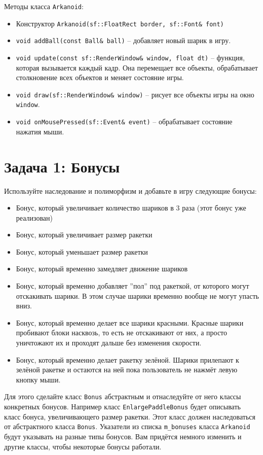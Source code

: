 \documentclass{article}
\begin{document}
Методы класса \texttt{Arkanoid}:
\begin{itemize}
\item Конструктор \texttt{Arkanoid(sf::FloatRect border, sf::Font\& font)}
\item \texttt{void addBall(const Ball\& ball)} -- добавляет новый шарик в игру.
\item \texttt{void update(const sf::RenderWindow\& window, float dt)} -- функция, которая вызывается каждый кадр. Она перемещает все объекты, обрабатывает столкновение всех объектов и меняет состояние игры.
\item \texttt{void draw(sf::RenderWindow\& window)} -- рисует все объекты игры на окно \texttt{window}.
\item \texttt{void onMousePressed(sf::Event\& event)} -- обрабатывает состояние нажатия мыши.
\end{itemize}


\newpage

\section*{Задача 1: Бонусы}
Используйте наследование и полиморфизм и добавьте в игру следующие бонусы:
\begin{itemize}
\item Бонус, который увеличивает количество шариков в 3 раза (этот бонус уже реализован)
\item Бонус, который увеличивает размер ракетки
\item Бонус, который уменьшает размер ракетки
\item Бонус, который временно замедляет движение шариков
\item Бонус, который временно добавляет ''пол'' под ракеткой, от которого могут отскакивать шарики. В этом случае шарики временно вообще не могут упасть вниз.
\item Бонус, который временно делает все шарики красными. Красные шарики пробивают блоки насквозь, то есть не отскакивают от них, а просто уничтожают их и проходят дальше без изменения скорости.
\item Бонус, который временно делает ракетку зелёной. Шарики прилепают к зелёной ракетке и остаются на ней пока пользователь не нажмёт левую кнопку мыши. 
\end{itemize}

Для этого сделайте класс \texttt{Bonus} абстрактным и отнаследуйте от него классы конкретных бонусов. Например класс \texttt{EnlargePaddleBonus} будет описывать класс бонуса, увеличивающего размер ракетки. Этот класс должен наследоваться от абстрактного класса \texttt{Bonus}. Указатели из списка \texttt{m\_bonuses} класса \texttt{Arkanoid} будут указывать на разные типы бонусов. Вам придётся немного изменить и другие классы, чтобы некоторые бонусы работали.
\end{document}

